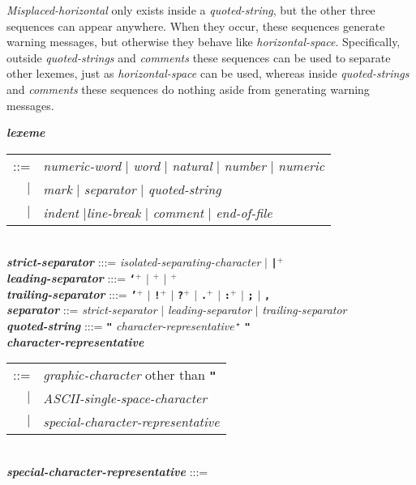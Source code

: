 \documentclass[12pt]{article}
\newcommand{\TT}[1]{{\tt \bfseries #1}}
\newcommand{\STAR}{{\Large $^\star$}}
\newcommand{\PLUS}[1][]{{$^{+#1}$}}
\newcommand{\emkey}[1]{{\em \bfseries #1}}
\newlength{\figurewidth}
\newenvironment{boxedfigure}[1][!btp]%
	{\begin{figure*}[#1]
	 \begin{lrbox}{\figurebox}
	 \begin{minipage}{\figurewidth}

	 \vspace*{1ex}}%
	{
	 \vspace*{1ex}

	 \end{minipage}
	 \end{lrbox}

	 \centering
	 \fbox{\hspace*{0.1in}\usebox{\figurebox}\hspace*{0.1in}}
	 \end{figure*}}
\begin{document}
{\em Misplaced-horizontal} only exists inside a {\em quoted-string},
but the other three sequences can appear anywhere.  When they occur,
these sequences generate warning messages, but otherwise they behave
like {\em horizontal-space}.  Specifically, outside {\em quoted-strings}
and {\em comments} these sequences can be used to separate other lexemes,
just as {\em horizontal-space} can be used,
whereas inside {\em quoted-strings} and
{\em comments} these sequences do nothing aside from generating
warning messages.

\begin{boxedfigure}[!p]

\emkey{lexeme}
        \begin{tabular}[t]{rl}
	::= & {\em numeric-word} $|$ {\em word} $|$
	      {\em natural} $|$ {\em number} $|$ {\em numeric} \\
	$|$ & {\em mark} $|$ {\em separator} $|$ {\em quoted-string} \\
	$|$ & {\em indent} $|${\em line-break} $|$
	      {\em comment} $|$ {\em end-of-file}
	\end{tabular}
\label{LEXEME}
\\[1ex]
\emkey{strict-separator} :::= {\em isolated-separating-character} $|$
                              \TT{|}\PLUS{}
\\[0.5ex]
\emkey{leading-separator} :::=
	\TT{`}\PLUS{} $|$ 
	\TT{\textexclamdown}\PLUS{} $|$ \TT{\textquestiondown}\PLUS{}
\\[0.5ex]
\emkey{trailing-separator} :::= \TT{'}\PLUS{} $|$
				   \TT{!}\PLUS{} $|$
				   \TT{?}\PLUS{} $|$
				   \TT{.}\PLUS{} $|$
				   \TT{:}\PLUS{} $|$
				   \TT{;} $|$
				   \TT{,}
\\[0.5ex]
\emkey{separator}
    ::= {\em strict-separator} 
    $|$ {\em leading-separator}
    $|$ {\em trailing-separator}
\\[1ex]
\emkey{quoted-string}\label{QUOTED-STRING} :::=
    \TT{"} {\em character-representative}\,\STAR{} \TT{"}
\\[0.3ex]
\emkey{character-representative}\label{CHARACTER-REPRESENTATIVE}
	\begin{tabular}[t]{@{}rl@{}}
	::= & {\em graphic-character} other than \TT{"} \\
	$|$ & {\em ASCII-single-space-character} \\
	$|$ & {\em special-character-representative} \\
	\end{tabular}
\\[0.3ex]
\emkey{special-character-representative} :::=

\end{boxedfigure}
\end{document}
